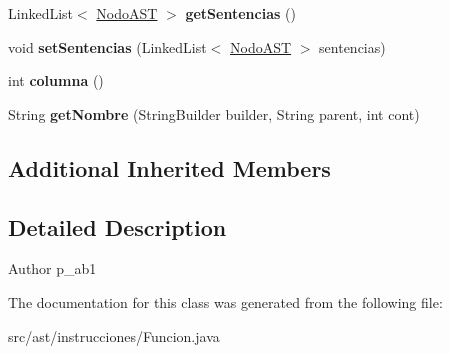 \begin{DoxyCompactItemize}
\item 
\mbox{\label{classast_1_1instrucciones_1_1_funcion_a5d69ae86434636e40863d566e8e5907f}} 
Linked\+List$<$ \mbox{\hyperlink{interfaceast_1_1_nodo_a_s_t}{Nodo\+A\+ST}} $>$ {\bfseries get\+Sentencias} ()
\item 
\mbox{\label{classast_1_1instrucciones_1_1_funcion_a2971bfe4d6d7372d38789b3264c72cf8}} 
void {\bfseries set\+Sentencias} (Linked\+List$<$ \mbox{\hyperlink{interfaceast_1_1_nodo_a_s_t}{Nodo\+A\+ST}} $>$ sentencias)
\item 
\mbox{\label{classast_1_1instrucciones_1_1_funcion_a66334c8bf95e6791cfaca7c1731ec11c}} 
int {\bfseries columna} ()
\item 
\mbox{\label{classast_1_1instrucciones_1_1_funcion_aaf67056d3d4c959ee09d1cee4e145a03}} 
String {\bfseries get\+Nombre} (String\+Builder builder, String parent, int cont)
\end{DoxyCompactItemize}
\subsection*{Additional Inherited Members}


\subsection{Detailed Description}
\begin{DoxyAuthor}{Author}
p\+\_\+ab1 
\end{DoxyAuthor}


The documentation for this class was generated from the following file\+:\begin{DoxyCompactItemize}
\item 
src/ast/instrucciones/Funcion.\+java\end{DoxyCompactItemize}
